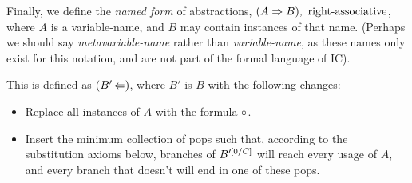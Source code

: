 \documentclass{article}
\begin{document}
  Finally, we define the \emph{named form} of abstractions, $(\nameabst{A}B),\ \operatorname{right-associative}$, where $A$ is a variable-name, and $B$ may contain instances of that name. (Perhaps we should say \emph{metavariable-name} rather than \emph{variable-name}, as these names only exist for this notation, and are not part of the formal language of IC).
  
  This is defined as $(B'\!\Leftarrow)$, where $B'$ is $B$ with the following changes:
  \begin{itemize}
    \item Replace all instances of $A$ with the formula $\circ$.
    \item Insert the minimum collection of pops such that, according to the substitution axioms below, branches of $B'^{[{0}{/}{C}]}$ will reach every usage of $A$, and every branch that doesn't will end in one of these pops.
  \end{itemize}
\end{document}
